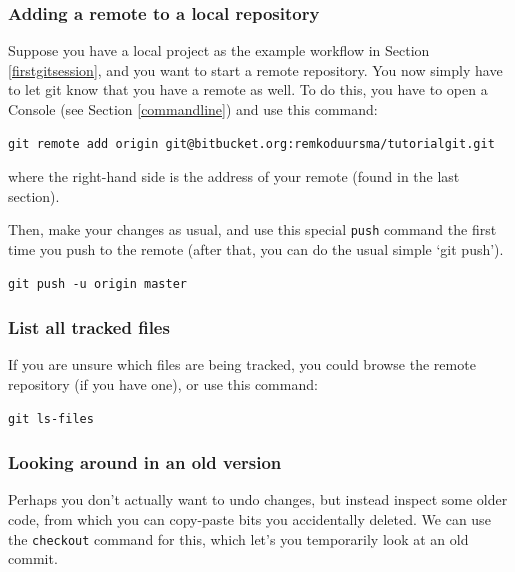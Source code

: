 \documentclass[]{book}
\begin{document}
\hypertarget{adding-a-remote-to-a-local-repository}{%
\subsubsection{Adding a remote to a local repository}\label{adding-a-remote-to-a-local-repository}}

Suppose you have a local project as the example workflow in Section \ref{firstgitsession}, and you want to start a remote repository. You now simply have to let git know that you have a remote as well. To do this, you have to open a Console (see Section \ref{commandline}) and use this command:

\begin{verbatim}
git remote add origin git@bitbucket.org:remkoduursma/tutorialgit.git
\end{verbatim}

where the right-hand side is the address of your remote (found in the last section).

Then, make your changes as usual, and use this special \texttt{push} command the first time you push to the remote (after that, you can do the usual simple `git push').

\begin{verbatim}
git push -u origin master
\end{verbatim}

\hypertarget{list-all-tracked-files}{%
\subsubsection{List all tracked files}\label{list-all-tracked-files}}

If you are unsure which files are being tracked, you could browse the remote repository (if you have one), or use this command:

\begin{verbatim}
git ls-files
\end{verbatim}

\hypertarget{looking-around-in-an-old-version}{%
\subsubsection{Looking around in an old version}\label{looking-around-in-an-old-version}}

Perhaps you don't actually want to undo changes, but instead inspect some older code, from which you can copy-paste bits you accidentally deleted. We can use the \texttt{checkout} command for this, which let's you temporarily look at an old commit.
\end{document}
